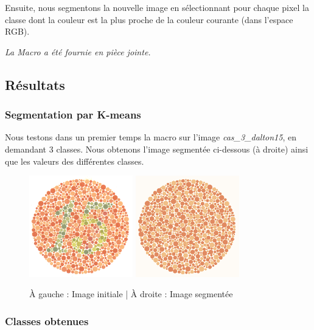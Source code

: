 \documentclass[a4paper]{article}
\begin{document}
Ensuite, nous segmentons la nouvelle image en sélectionnant pour chaque pixel la classe dont la couleur est la plus proche de la couleur courante (dans l'espace RGB).

{\em La Macro a été fournie en pièce jointe.}

\subsection{Résultats}

\subsubsection{Segmentation par K-means}

Nous testons dans un premier temps la macro sur l'image {\em cas\_3\_dalton15}, en demandant 3 classes. Nous obtenons l'image segmentée ci-dessous (à droite) ainsi que les valeurs des différentes classes.

\begin{figure}[H]
\begin{center}
\includegraphics[width=170px]{../base/cas_3_dalton15.png}
\includegraphics[width=170px]{../resultats/cas_3_dalton15_seg.png}
\end{center}
\caption{À gauche : Image initiale | À droite : Image segmentée}
\end{figure}

\clearpage
\subsubsection{Classes obtenues}
\end{document}
